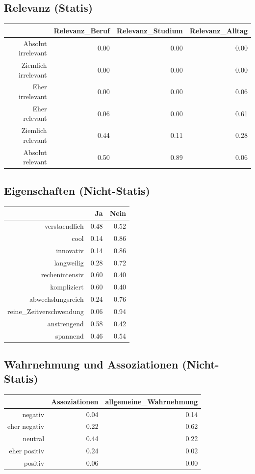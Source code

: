 \documentclass[12pt,a4paper,titlepage=true,parskip,ngerman]{scrartcl}
\begin{document}
\subsection{Relevanz (Statis)}
\begin{table}[ht]
\begin{tabular}{rrrr}
  \hline
 & Relevanz\_Beruf & Relevanz\_Studium & Relevanz\_Alltag \\ 
  \hline
Absolut irrelevant & 0.00 & 0.00 & 0.00 \\ 
  Ziemlich irrelevant & 0.00 & 0.00 & 0.00 \\ 
  Eher irrelevant & 0.00 & 0.00 & 0.06 \\ 
  Eher relevant & 0.06 & 0.00 & 0.61 \\ 
  Ziemlich relevant & 0.44 & 0.11 & 0.28 \\ 
  Absolut relevant & 0.50 & 0.89 & 0.06 \\ 
   \hline
\end{tabular}
\end{table}
\newpage

\subsection{Eigenschaften (Nicht-Statis)}
\begin{table}[ht]
\begin{tabular}{rrr}
  \hline
 & Ja & Nein \\ 
  \hline
verstaendlich & 0.48 & 0.52 \\ 
  cool & 0.14 & 0.86 \\ 
  innovativ & 0.14 & 0.86 \\ 
  langweilig & 0.28 & 0.72 \\ 
  rechenintensiv & 0.60 & 0.40 \\ 
  kompliziert & 0.60 & 0.40 \\ 
  abwechslungsreich & 0.24 & 0.76 \\ 
  reine\_Zeitverschwendung & 0.06 & 0.94 \\ 
  anstrengend & 0.58 & 0.42 \\ 
  spannend & 0.46 & 0.54 \\ 
   \hline
\end{tabular}
\end{table}

\subsection{Wahrnehmung und Assoziationen (Nicht-Statis)}
\begin{table}[ht]
\begin{tabular}{rrr}
  \hline
 & Assoziationen & allgemeine\_Wahrnehmung \\ 
  \hline
negativ & 0.04 & 0.14 \\ 
  eher negativ & 0.22 & 0.62 \\ 
  neutral & 0.44 & 0.22 \\ 
  eher positiv & 0.24 & 0.02 \\ 
  positiv & 0.06 & 0.00 \\ 
   \hline
\end{tabular}
\end{table}
\end{document}
